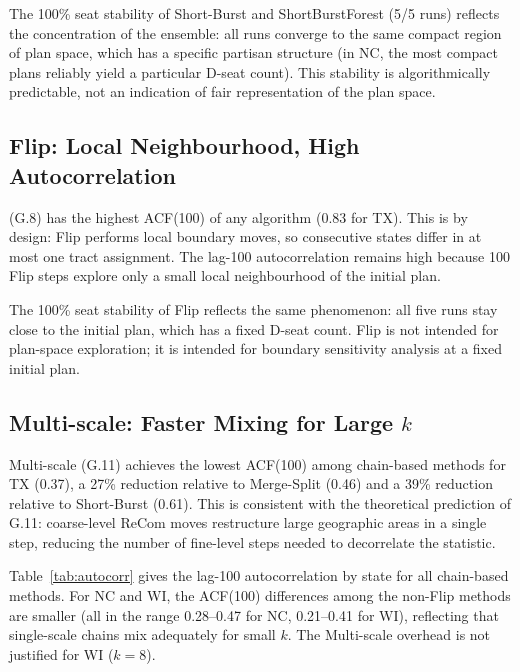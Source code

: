 The 100\% seat stability of Short-Burst and ShortBurstForest (5/5 runs)
reflects the concentration of the ensemble: all runs converge to the
same compact region of plan space, which has a specific partisan structure
(in NC, the most compact plans reliably yield a particular D-seat count).
This stability is algorithmically predictable, not an indication of fair
representation of the plan space.

\subsection{Flip: Local Neighbourhood, High Autocorrelation}

\flip{} (G.8) has the highest ACF(100) of any algorithm (0.83 for TX).
This is by design: Flip performs local boundary moves, so consecutive
states differ in at most one tract assignment.
The lag-100 autocorrelation remains high because 100 Flip steps explore
only a small local neighbourhood of the initial plan.

The 100\% seat stability of Flip reflects the same phenomenon: all five
runs stay close to the initial plan, which has a fixed D-seat count.
Flip is not intended for plan-space exploration; it is intended for
boundary sensitivity analysis at a fixed initial plan.

\subsection{Multi-scale: Faster Mixing for Large $k$}

Multi-scale (G.11) achieves the lowest ACF(100) among chain-based methods
for TX (0.37), a 27\% reduction relative to Merge-Split (0.46) and a 39\%
reduction relative to Short-Burst (0.61).
This is consistent with the theoretical prediction of G.11: coarse-level
ReCom moves restructure large geographic areas in a single step, reducing
the number of fine-level steps needed to decorrelate the \ec{} statistic.

Table~\ref{tab:autocorr} gives the lag-100 autocorrelation by state for
all chain-based methods.
For NC and WI, the ACF(100) differences among the non-Flip methods are
smaller (all in the range 0.28--0.47 for NC, 0.21--0.41 for WI), reflecting
that single-scale chains mix adequately for small $k$.
The Multi-scale overhead is not justified for WI ($k = 8$).

